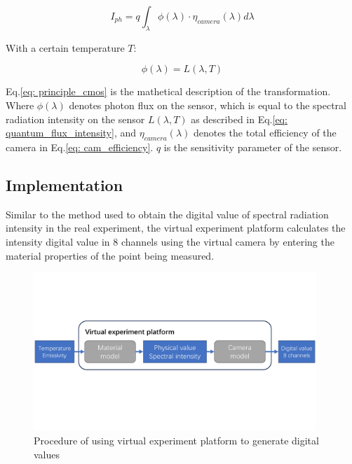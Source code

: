 \begin{equation}
    \label{eq: principle_cmos}
    I_{ph} = q \int_{\lambda}^{} \phi(\lambda) \cdot \eta_{camera}(\lambda) d\lambda
\end{equation}

With a certain temperature $T$: 

\begin{equation}
    \label{eq: quantum_flux_intensity}
    \phi(\lambda) = L(\lambda, T)
\end{equation}

Eq.\ref{eq: principle_cmos} is the mathetical description of the 
transformation. Where $\phi(\lambda)$ denotes photon flux on the sensor, 
which is equal to the spectral radiation intensity on the sensor $L(\lambda, T)$ as 
described in Eq.\ref{eq: quantum_flux_intensity}, and $\eta_{camera}(\lambda)$
denotes the total efficiency of the camera in Eq.\ref{eq: cam_efficiency}. $q$ is the sensitivity parameter 
of the sensor.


\subsection{Implementation}
Similar to the method used to obtain the digital value of spectral radiation intensity 
in the real experiment, the virtual experiment platform calculates the 
intensity digital value in 8 channels using the virtual camera by entering 
the material properties of the point being measured.


\begin{figure}[htbp]
    \centering
    \includegraphics[width=0.95\textwidth]{figures/camera_model.pdf}
    \caption{Procedure of using virtual experiment platform to generate digital values}
    \label{fig: process_virtual_platform}
\end{figure}

